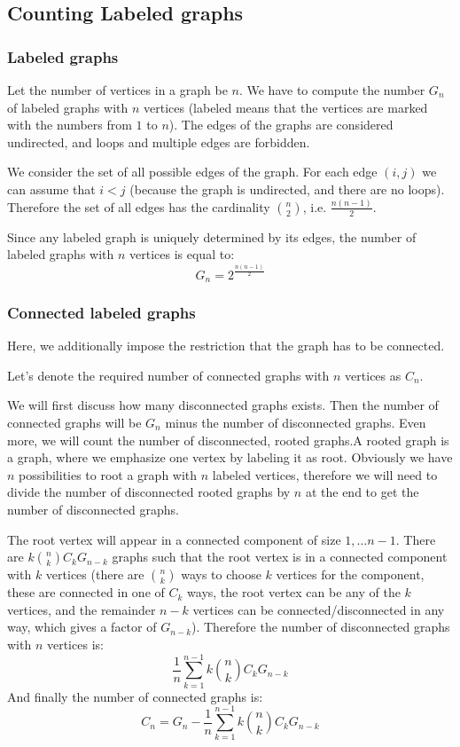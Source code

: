 \documentclass[8pt, a4paper, oneside, twocolumn]{extarticle}
\begin{document}
\subsection{Counting Labeled graphs}
\subsubsection{Labeled graphs}

Let the number of vertices in a graph be $n$. We have to compute the number $G_n$ of labeled graphs with $n$ vertices (labeled means that the vertices are marked with the numbers from $1$ to $n$). The edges of the graphs are considered undirected, and loops and multiple edges are forbidden.

We consider the set of all possible edges of the graph. For each edge $(i, j)$ we can assume that $i < j$ (because the graph is undirected, and there are no loops). Therefore the set of all edges has the cardinality $\binom{n}{2}$, i.e. $\frac{n(n-1)}{2}$.

Since any labeled graph is uniquely determined by its edges, the number of labeled graphs with $n$ vertices is equal to: $$G_n = 2^{\frac{n(n-1)}{2}}$$
\subsubsection{Connected labeled graphs}

Here, we additionally impose the restriction that the graph has to be connected.

Let's denote the required number of connected graphs with $n$ vertices as $C_n$.

We will first discuss how many disconnected graphs exists. Then the number of connected graphs will be $G_n$ minus the number of disconnected graphs. Even more, we will count the number of disconnected, rooted graphs.A rooted graph is a graph, where we emphasize one vertex by labeling it as root. Obviously we have $n$ possibilities to root a graph with $n$ labeled vertices, therefore we will need to divide the number of disconnected rooted graphs by $n$ at the end to get the number of disconnected graphs.

The root vertex will appear in a connected component of size $1, \dots n-1$. There are $k \binom{n}{k} C_k G_{n-k}$ graphs such that the root vertex is in a connected component with $k$ vertices (there are $\binom{n}{k}$ ways to choose $k$ vertices for the component, these are connected in one of $C_k$ ways, the root vertex can be any of the $k$ vertices, and the remainder $n-k$ vertices can be connected/disconnected in any way, which gives a factor of $G_{n-k}$). Therefore the number of disconnected graphs with $n$ vertices is: $$\frac{1}{n} \sum_{k=1}^{n-1} k \binom{n}{k} C_k G_{n-k}$$ And finally the number of connected graphs is: $$C_n = G_n - \frac{1}{n} \sum_{k=1}^{n-1} k \binom{n}{k} C_k G_{n-k}$$
\end{document}
